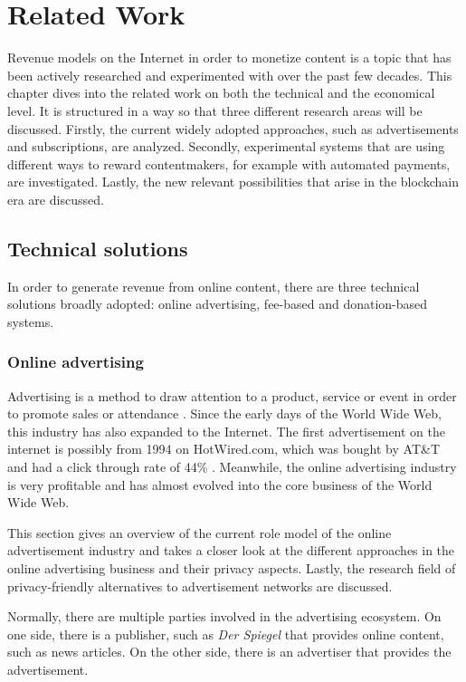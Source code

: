 \chapter{Related Work}
\label{cha:relatedwork}

Revenue models on the Internet in order to monetize content is a topic that has been actively researched and experimented with over the past few decades. This chapter dives into the related work on both the technical and the economical level. It is structured in a way so that three different research areas will be discussed.
Firstly, the current widely adopted approaches, such as advertisements and subscriptions, are analyzed. Secondly, experimental systems that are using different ways to reward contentmakers, for example with automated payments, are investigated. Lastly, the new relevant possibilities that arise in the blockchain era are discussed.

\section{Technical solutions}

In order to generate revenue from online content, there are three technical solutions broadly adopted: online advertising, fee-based and donation-based systems.

\subsection{Online advertising}
Advertising is a method to draw attention to a product, service or event in order to promote sales or attendance \cite{stanton1994fundamentals}. Since the early days of the World Wide Web, this industry has also expanded to the Internet. The first advertisement on the internet is possibly from 1994 on HotWired.com, which was bought by AT\&T and had a click through rate of 44\% \cite{firstbanner}. Meanwhile, the online advertising industry is very profitable and has almost evolved into the core business of the World Wide Web.

This section gives an overview of the current role model of the online advertisement industry and takes a closer look at the different approaches in the online advertising business and their privacy aspects. Lastly, the research field of privacy-friendly alternatives to advertisement networks are discussed.

Normally, there are multiple parties involved in the advertising ecosystem. On one side, there is a publisher, such as \textit{Der Spiegel} that provides online content, such as news articles. On the other side, there is an advertiser that provides the advertisement.


